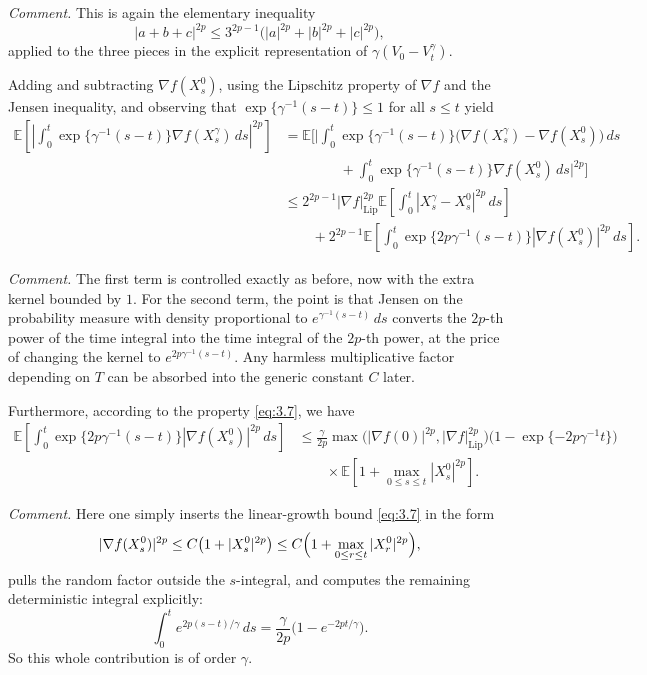 \documentclass[11pt]{article}
\theoremstyle{remark}
\begin{document}
{\color{teal}
\noindent\emph{Comment.} This is again the elementary inequality
\[
|a+b+c|^{2p}\le 3^{2p-1}\bigl(|a|^{2p}+|b|^{2p}+|c|^{2p}\bigr),
\]
applied to the three pieces in the explicit representation of $\gamma(V_0-V_t^\gamma)$.
}


Adding and subtracting $\nabla f(X_s^0)$, using the Lipschitz property of $\nabla f$ and the Jensen inequality, and observing that $\exp\{\gamma^{-1}(s-t)\}\le 1$ for all $s\le t$ yield
\[
\begin{aligned}
\mathbb{E}\left[\left|\int_0^t \exp\{\gamma^{-1}(s-t)\}\nabla f(X_s^{\gamma})\,ds\right|^{2p}\right]
&=\mathbb{E}\Biggl[\Biggl|\int_0^t \exp\{\gamma^{-1}(s-t)\}\bigl(\nabla f(X_s^{\gamma})-\nabla f(X_s^0)\bigr)\,ds \\
&\qquad\qquad +\int_0^t \exp\{\gamma^{-1}(s-t)\}\nabla f(X_s^0)\,ds\Biggr|^{2p}\Biggr] \\
&\le 2^{2p-1}|\nabla f|_{\mathrm{Lip}}^{2p}\mathbb{E}\left[\int_0^t |X_s^{\gamma}-X_s^0|^{2p}\,ds\right] \\
&\qquad +2^{2p-1}\mathbb{E}\left[\int_0^t \exp\{2p\gamma^{-1}(s-t)\}|\nabla f(X_s^0)|^{2p}\,ds\right].
\end{aligned}
\]

{\color{teal}
\noindent\emph{Comment.} The first term is controlled exactly as before, now with the extra kernel bounded by $1$. For the second term, the point is that Jensen on the probability measure with density proportional to $e^{\gamma^{-1}(s-t)}\,ds$ converts the $2p$-th power of the time integral into the time integral of the $2p$-th power, at the price of changing the kernel to $e^{2p\gamma^{-1}(s-t)}$. Any harmless multiplicative factor depending on $T$ can be absorbed into the generic constant $C$ later.
}

Furthermore, according to the property \eqref{eq:3.7}, we have
\[
\begin{aligned}
\mathbb{E}\left[\int_0^t \exp\{2p\gamma^{-1}(s-t)\}|\nabla f(X_s^0)|^{2p}\,ds\right]
&\le \frac{\gamma}{2p}\max\bigl(|\nabla f(0)|^{2p},|\nabla f|_{\mathrm{Lip}}^{2p}\bigr)\bigl(1-\exp\{-2p\gamma^{-1}t\}\bigr) \\
&\qquad\times \mathbb{E}\left[1+\max_{0\le s\le t}|X_s^0|^{2p}\right].
\end{aligned}
\]

{\color{teal}
\noindent\emph{Comment.} Here one simply inserts the linear-growth bound \eqref{eq:3.7} in the form
\[
|\nabla f(X_s^0)|^{2p}\le C\bigl(1+|X_s^0|^{2p}\bigr)\le C\Bigl(1+\max_{0\le r\le t}|X_r^0|^{2p}\Bigr),
\]
pulls the random factor outside the $s$-integral, and computes the remaining deterministic integral explicitly:
\[
\int_0^t e^{2p(s-t)/\gamma}\,ds=\frac{\gamma}{2p}\bigl(1-e^{-2pt/\gamma}\bigr).
\]
So this whole contribution is of order $\gamma$.
}
\end{document}
